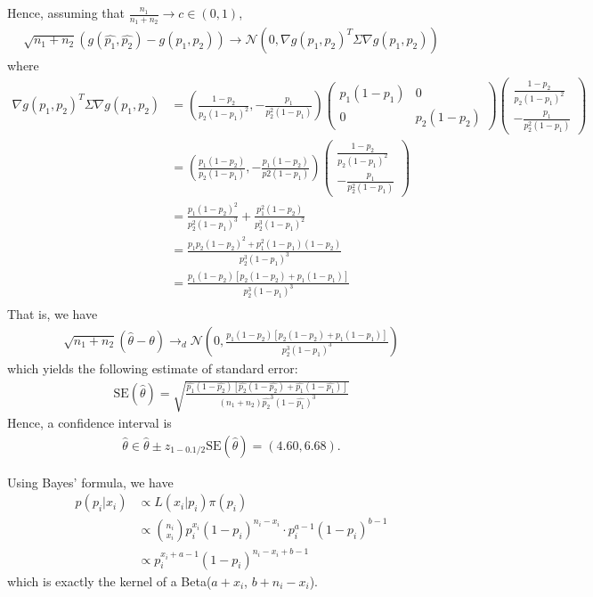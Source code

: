 \documentclass[11pt]{article}
\newcommand*\ba{\[ \begin{aligned}}
\newcommand*\ea{\end{aligned} \]}
\newcommand*\estim[1]{\widehat{#1}}
\renewcommand\;{\,}
\begin{document}
Hence, assuming that $\frac{n_1}{n_1 + n_2} \to c \in (0, 1)$,
\ba 
\sqrt{n_1 + n_2} \left(g(\estim{p_1}, \estim{p_2}) - g(p_1, p_2)\right)
	\to \mathcal N \left( 0, \nabla g(p_1, p_2)^T 
	\Sigma \nabla g(p_1, p_2) \right)
\ea
where
\ba
\nabla g(p_1, p_2)^T 
	\Sigma \nabla g(p_1, p_2)
	& = \left( \frac{1 - p_2}{p_2(1 - p_1)^2}, -\frac{p_1}{p_2^2(1 - p_1)} \right) 
		\begin{pmatrix} p_1(1 - p_1) & 0 \\
		0 & p_2(1 - p_2)
		\end{pmatrix}
		\begin{pmatrix} \frac{1 - p_2}{p_2(1 - p_1)^2} \\ -\frac{p_1}{p_2^2(1 - p_1)}  \end{pmatrix} \\
	& = \left( \frac{p_1(1 - p_2)}{p_2 (1 - p_1)}, - \frac{p_1 (1 - p_2)}{ p2(1 - p_1) } \right)
		\begin{pmatrix} \frac{1 - p_2}{p_2(1 - p_1)^2} \\ -\frac{p_1}{p_2^2(1 - p_1)}  \end{pmatrix} \\
	& = \frac{ p_1 (1 - p_2)^2 }{ p_2^2 (1 - p_1)^3} + \frac{ p_1^2 ( 1 - p_2) }{p_2^3 (1 - p_1)^2 } \\
	& = \frac{ p_1 p_2 (1 - p_2)^2 + p_1^2 (1 - p_1)(1 - p_2) }{ p_2^3 (1 - p_1)^3 } \\
	& = \frac{ p_1(1 - p_2)\left[ p_2(1 - p_2) + p_1(1 - p_1) \right] }{ p_2^3 (1 - p_1)^3 } \\
\ea
That is, we have
\ba
\sqrt{n_1 + n_2} \left( \estim{\theta} - \theta \right) \to_d \mathcal{N}\left(0, 
	\frac{ p_1(1 - p_2)\left[ p_2(1 - p_2) + p_1(1 - p_1) \right] }{ p_2^3 (1 - p_1)^3 } \right)
\ea
which yields the following estimate of standard error:
\ba
\text{SE}\left(\estim{\theta}\right) = 
 \sqrt{ \frac{ \estim{p_1}(1 - \estim{p_2})\left[ \estim{p_2}(1 - \estim{p_2}) 
 	+ \estim{p_1}(1 - \estim{p_1}) \right] }
	{ (n_1 + n_2) \estim{p_2}^3 (1 - \estim{p_1})^3 } }
\ea
Hence, a confidence interval is
\ba
\estim{\theta} \in \estim{\theta} \pm z_{1 - 0.1/2} \text{SE}\left(\estim{\theta}\right)
	= (4.60, 6.68).
\ea
\item
Using Bayes' formula, we have
\ba
p(p_i | x_i) & \propto
	L(x_i | p_i) \pi(p_i) \\
	& \propto {n_i \choose x_i} p_i^{x_i} (1 - p_i)^{n_i - x_i}
		\cdot p_i^{a - 1} (1 - p_i)^{b - 1} \\
	& \propto p_i^{x_i + a - 1} (1 - p_i)^{n_i - x_i + b - 1}
\ea
which is exactly the kernel of a Beta($a + x_i$, $b + n_i - x_i$). 
\end{document}
